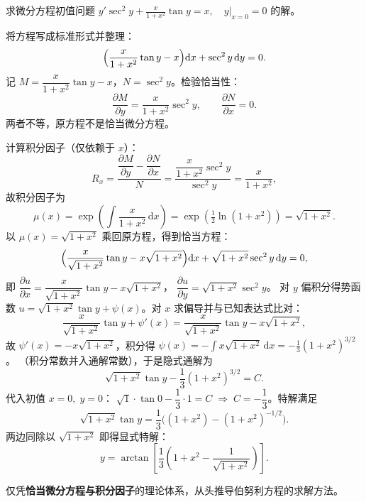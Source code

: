 \documentclass[lang=cn,11pt]{elegantbook}
\begin{document}
\begin{exercise}[一阶线性微分方程初值问题]
求微分方程初值问题
$\displaystyle y'\sec^{2}y+\frac{x}{1+x^{2}}\tan y=x,\quad y\big|_{x=0}=0$
的解。
\end{exercise}
\begin{solution}
将方程写成标准形式并整理：
\[
\Bigl(\frac{x}{1+x^{2}}\tan y-x\Bigr)\mathrm{d}x+\sec^{2}y\,\mathrm{d}y=0.
\]
记 $M=\dfrac{x}{1+x^{2}}\tan y-x$，$N=\sec^{2}y$。检验恰当性：
\[
\frac{\partial M}{\partial y}=\frac{x}{1+x^{2}}\sec^{2}y,
\qquad
\frac{\partial N}{\partial x}=0.
\]
两者不等，原方程不是恰当微分方程。

计算积分因子（仅依赖于 $x$）：
\[
R_{x}=\frac{\dfrac{\partial M}{\partial y}-\dfrac{\partial N}{\partial x}}{N}
 =\frac{\dfrac{x}{1+x^{2}}\sec^{2}y}{\sec^{2}y}
 =\frac{x}{1+x^{2}},
\]
故积分因子为
\[
\mu(x)=\exp\!\left(\int\frac{x}{1+x^{2}}\,\mathrm{d}x\right)
 =\exp\!\left(\tfrac12\ln(1+x^{2})\right)=\sqrt{1+x^{2}}.
\]
以 $\mu(x)=\sqrt{1+x^{2}}$ 乘回原方程，得到恰当方程：
\[
\Bigl(\frac{x}{\sqrt{1+x^{2}}}\tan y-x\sqrt{1+x^{2}}\Bigr)\mathrm{d}x
 +\sqrt{1+x^{2}}\sec^{2}y\,\mathrm{d}y=0,
\]
即 $\dfrac{\partial u}{\partial x}=\dfrac{x}{\sqrt{1+x^{2}}}\tan y-x\sqrt{1+x^{2}}$，
$\dfrac{\partial u}{\partial y}=\sqrt{1+x^{2}}\sec^{2}y$。
对 $y$ 偏积分得势函数
$u=\sqrt{1+x^{2}}\tan y+\psi(x)$。对 $x$ 求偏导并与已知表达式比对：
\[
\frac{x}{\sqrt{1+x^{2}}}\tan y+\psi'(x)
=\frac{x}{\sqrt{1+x^{2}}}\tan y-x\sqrt{1+x^{2}},
\]
故 $\psi'(x)=-x\sqrt{1+x^{2}}$，积分得
$\displaystyle\psi(x)=-\int x\sqrt{1+x^{2}}\,\mathrm{d}x=-\frac13(1+x^{2})^{3/2}$。
（积分常数并入通解常数），于是隐式通解为
\[
\sqrt{1+x^{2}}\tan y-\frac13(1+x^{2})^{3/2}=C.
\]
代入初值 $x=0,\;y=0$：
$\sqrt1\cdot\tan 0-\dfrac13\cdot 1=C\;\Longrightarrow\;C=-\dfrac13$。特解满足
\[
\sqrt{1+x^{2}}\tan y=\frac13\bigl((1+x^{2})-(1+x^{2})^{-1/2}\bigr).
\]
两边同除以 $\sqrt{1+x^{2}}$ 即得显式特解：
\[
\boxed{
y=\arctan\!\left[\frac13\!\left(1+x^{2}-\frac{1}{\sqrt{1+x^{2}}}\right)\right].
}\]
\end{solution}

\begin{exercise}
仅凭\textbf{恰当微分方程与积分因子}的理论体系，从头推导伯努利方程的求解方法。
\end{exercise}
\end{document}
